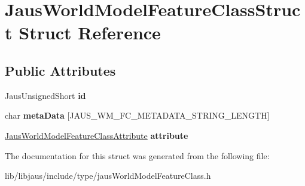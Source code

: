 \hypertarget{struct_jaus_world_model_feature_class_struct}{\section{\-Jaus\-World\-Model\-Feature\-Class\-Struct \-Struct \-Reference}
\label{struct_jaus_world_model_feature_class_struct}
}
\subsection*{\-Public \-Attributes}
\begin{DoxyCompactItemize}
\item 
\hypertarget{struct_jaus_world_model_feature_class_struct_ad60e0496a16fbe081ded52d755018db3}{\-Jaus\-Unsigned\-Short {\bfseries id}}\label{struct_jaus_world_model_feature_class_struct_ad60e0496a16fbe081ded52d755018db3}

\item 
\hypertarget{struct_jaus_world_model_feature_class_struct_aceaa72e46317e7cd6f4aa3403cbaf87d}{char {\bfseries meta\-Data} \mbox{[}\-J\-A\-U\-S\-\_\-\-W\-M\-\_\-\-F\-C\-\_\-\-M\-E\-T\-A\-D\-A\-T\-A\-\_\-\-S\-T\-R\-I\-N\-G\-\_\-\-L\-E\-N\-G\-T\-H\mbox{]}}\label{struct_jaus_world_model_feature_class_struct_aceaa72e46317e7cd6f4aa3403cbaf87d}

\item 
\hypertarget{struct_jaus_world_model_feature_class_struct_ac9d21c31191b9ad7148c8332b804a635}{\hyperlink{struct_jaus_world_model_feature_class_attribute_struct}{\-Jaus\-World\-Model\-Feature\-Class\-Attribute} {\bfseries attribute}}\label{struct_jaus_world_model_feature_class_struct_ac9d21c31191b9ad7148c8332b804a635}

\end{DoxyCompactItemize}


\-The documentation for this struct was generated from the following file\-:\begin{DoxyCompactItemize}
\item 
lib/libjaus/include/type/jaus\-World\-Model\-Feature\-Class.\-h\end{DoxyCompactItemize}
